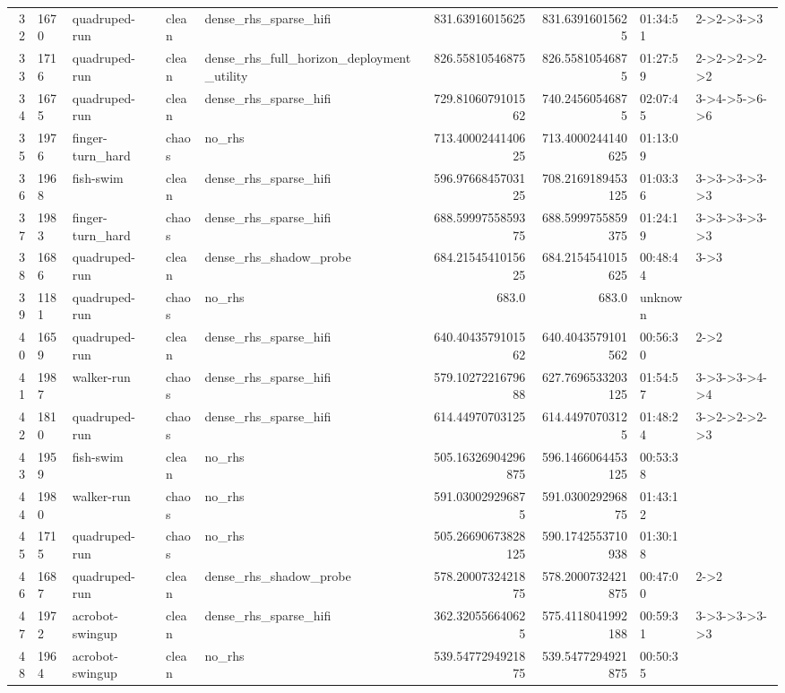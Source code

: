 \begin{tabular}{rllllrrll}
32 & 1670 & quadruped-run & clean & dense\_rhs\_sparse\_hifi & 831.63916015625 & 831.63916015625 & 01:34:51 & 2->2->3->3 \\
33 & 1716 & quadruped-run & clean & dense\_rhs\_full\_horizon\_deployment\_utility & 826.55810546875 & 826.55810546875 & 01:27:59 & 2->2->2->2->2 \\
34 & 1675 & quadruped-run & clean & dense\_rhs\_sparse\_hifi & 729.8106079101562 & 740.24560546875 & 02:07:45 & 3->4->5->6->6 \\
35 & 1976 & finger-turn\_hard & chaos & no\_rhs & 713.4000244140625 & 713.4000244140625 & 01:13:09 &  \\
36 & 1968 & fish-swim & clean & dense\_rhs\_sparse\_hifi & 596.9766845703125 & 708.2169189453125 & 01:03:36 & 3->3->3->3->3 \\
37 & 1983 & finger-turn\_hard & chaos & dense\_rhs\_sparse\_hifi & 688.5999755859375 & 688.5999755859375 & 01:24:19 & 3->3->3->3->3 \\
38 & 1686 & quadruped-run & clean & dense\_rhs\_shadow\_probe & 684.2154541015625 & 684.2154541015625 & 00:48:44 & 3->3 \\
39 & 1181 & quadruped-run & chaos & no\_rhs & 683.0 & 683.0 & unknown &  \\
40 & 1659 & quadruped-run & clean & dense\_rhs\_sparse\_hifi & 640.4043579101562 & 640.4043579101562 & 00:56:30 & 2->2 \\
41 & 1987 & walker-run & chaos & dense\_rhs\_sparse\_hifi & 579.1027221679688 & 627.7696533203125 & 01:54:57 & 3->3->3->4->4 \\
42 & 1810 & quadruped-run & chaos & dense\_rhs\_sparse\_hifi & 614.44970703125 & 614.44970703125 & 01:48:24 & 3->2->2->2->3 \\
43 & 1959 & fish-swim & clean & no\_rhs & 505.16326904296875 & 596.1466064453125 & 00:53:38 &  \\
44 & 1980 & walker-run & chaos & no\_rhs & 591.030029296875 & 591.030029296875 & 01:43:12 &  \\
45 & 1715 & quadruped-run & chaos & no\_rhs & 505.26690673828125 & 590.1742553710938 & 01:30:18 &  \\
46 & 1687 & quadruped-run & clean & dense\_rhs\_shadow\_probe & 578.2000732421875 & 578.2000732421875 & 00:47:00 & 2->2 \\
47 & 1972 & acrobot-swingup & clean & dense\_rhs\_sparse\_hifi & 362.320556640625 & 575.4118041992188 & 00:59:31 & 3->3->3->3->3 \\
48 & 1964 & acrobot-swingup & clean & no\_rhs & 539.5477294921875 & 539.5477294921875 & 00:50:35 &  \\

\end{tabular}
